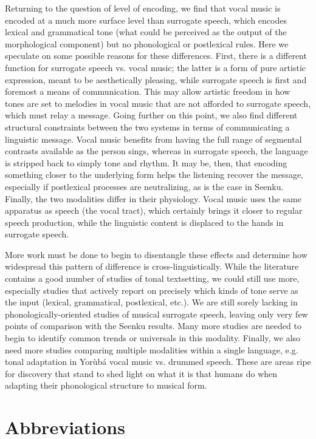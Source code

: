 \documentclass[output=paper]{langscibook}
\begin{document}
Returning to the question of level of encoding, we find that vocal music is encoded at a much more surface level than surrogate speech, which encodes lexical and grammatical tone (what could be perceived as the output of the morphological component) but no phonological or postlexical rules. Here we speculate on some possible reasons for these differences. First, there is a different function for surrogate speech vs. vocal music; the latter is a form of pure artistic expression, meant to be aesthetically pleasing, while surrogate speech is first and foremost a means of communication. This may allow artistic freedom in how tones are set to melodies in vocal music that are not afforded to surrogate speech, which must relay a message. Going further on this point, we also find different structural constraints between the two systems in terms of communicating a linguistic message. Vocal music benefits from having the full range of segmental contrasts available as the person sings, whereas in surrogate speech, the language is stripped back to simply tone and rhythm. It may be, then, that encoding something closer to the underlying form helps the listening recover the message, especially if postlexical processes are neutralizing, as is the case in Seenku. Finally, the two modalities differ in their physiology. Vocal music uses the same apparatus as speech (the vocal tract), which certainly brings it closer to regular speech production, while the linguistic content is displaced to the hands in surrogate speech. 

More work must be done to begin to disentangle these effects and determine how widespread this pattern of difference is cross-linguistically. While the literature contains a good number of studies of tonal textsetting, we could still use more, especially studies that actively report on precisely which kinds of tone serve as the input (lexical, grammatical, postlexical, etc.). We are still sorely lacking in phonologically-oriented studies of musical surrogate speech, leaving only very few points of comparison with the Seenku results. Many more studies are needed to begin to identify common trends or universals in this modality. Finally, we also need more studies comparing multiple modalities within a single language, e.g. tonal adaptation in Yorùbá vocal music vs. drummed speech. These are areas ripe for discovery that stand to shed light on what it is that humans do when adapting their phonological structure to musical form. 

\section*{Abbreviations}
\end{document}
